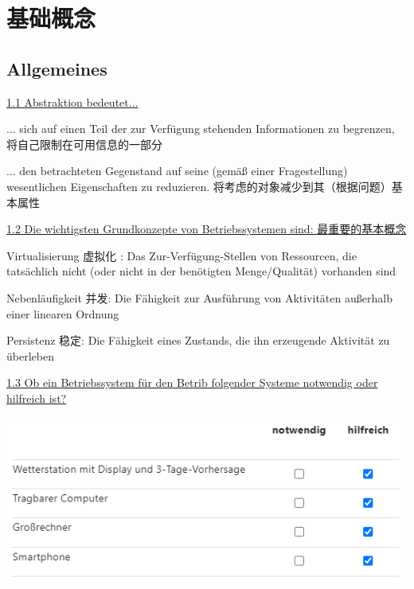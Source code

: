 \documentclass[fleqn]{article}
\begin{document}



\pagestyle{main}




\section{基础概念}

\subsection{Allgemeines}

\noindent\uline{1.1 Abstraktion bedeutet...} 
 
... sich auf einen Teil der zur Verfügung stehenden Informationen zu begrenzen, 将自己限制在可用信息的一部分

... den betrachteten Gegenstand auf seine (gemäß einer Fragestellung) wesentlichen Eigenschaften zu reduzieren.
将考虑的对象减少到其（根据问题）基本属性

\noindent\uline{1.2 Die wichtigsten Grundkonzepte von Betriebssystemen sind: 最重要的基本概念}
 
Virtualisierung 虚拟化 : Das Zur-Verfügung-Stellen von Ressourcen, die tatsächlich nicht (oder nicht in der benötigten Menge/Qualität) vorhanden sind

Nebenläufigkeit 并发: Die Fähigkeit zur Ausführung von Aktivitäten außerhalb einer linearen Ordnung
 
Persistenz 稳定: Die Fähigkeit eines Zustands, die ihn erzeugende Aktivität zu überleben
 
\noindent\uline{1.3 Ob ein Betriebssystem für den Betrib folgender Systeme notwendig oder hilfreich ist?}
 
\begin{center}
    \includegraphics[scale=1]{1.png}
\end{center}
\end{document}
